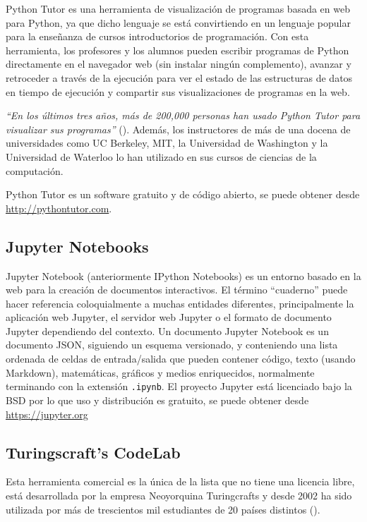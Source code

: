 Python Tutor es una herramienta de visualización de programas basada en web para Python, ya que dicho lenguaje se está convirtiendo en un lenguaje popular para la enseñanza de cursos introductorios de programación. Con esta herramienta, los profesores y los alumnos pueden escribir programas de Python directamente en el navegador web (sin instalar ningún complemento), avanzar y retroceder a través de la ejecución para ver el estado de las estructuras de datos en tiempo de ejecución y compartir sus visualizaciones de programas en la web.

\bigskip
\textit{``En los últimos tres años, más de 200,000 personas han usado Python Tutor para visualizar sus programas''} (\cite{GuoSIGCSE2013}). Además, los instructores de más de una docena de universidades como UC Berkeley, MIT, la Universidad de Washington y la Universidad de Waterloo lo han utilizado en sus cursos de ciencias de la computación.

\bigskip
Python Tutor es un software gratuito y de código abierto, se puede obtener desde \url{http://pythontutor.com}.


\subsection {Jupyter Notebooks}

Jupyter Notebook (anteriormente IPython Notebooks) es un entorno basado en la web para la creación de documentos interactivos. El término ``cuaderno'' puede hacer referencia coloquialmente a muchas entidades diferentes, principalmente la aplicación web Jupyter, el servidor web Jupyter o el formato de documento Jupyter dependiendo del contexto. Un documento Jupyter Notebook es un documento JSON, siguiendo un esquema versionado, y conteniendo una lista ordenada de celdas de entrada/salida que pueden contener código, texto (usando Markdown), matemáticas, gráficos y medios enriquecidos, normalmente terminando con la extensión \texttt{.ipynb}. El proyecto Jupyter está licenciado bajo la BSD por lo que uso y distribución es gratuito, se puede obtener desde \url{https://jupyter.org}

\subsection {Turingscraft's CodeLab}

Esta herramienta comercial es la única de la lista que no tiene una licencia libre, está desarrollada por la empresa Neoyorquina Turingcrafts y desde 2002 ha sido utilizada por más de trescientos mil estudiantes de 20 países distintos (\cite{barr_using_2016}).

